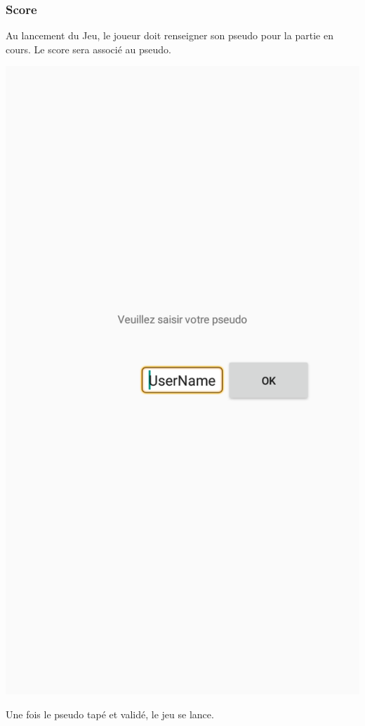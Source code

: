 \documentclass[a4paper]{article}
\begin{document}
\subsubsection{Score}
Au lancement du Jeu, le joueur doit renseigner son pseudo pour la partie en cours. Le score sera associé au pseudo.
\begin{center}
  \includegraphics[scale=0.20]{images/score.png}
\end{center}
Une fois le pseudo tapé et validé, le jeu se lance.
\end{document}

